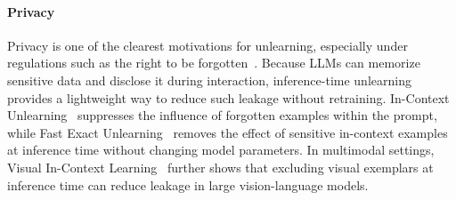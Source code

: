 \paragraph{Privacy}
Privacy is one of the clearest motivations for unlearning, especially under regulations such as the right to be forgotten~\citep{voigt2017eu, bonta2022california}. Because LLMs can memorize sensitive data and disclose it during interaction, inference-time unlearning provides a lightweight way to reduce such leakage without retraining. In-Context Unlearning~\citep{pawelczyk2023context} suppresses the influence of forgotten examples within the prompt, while Fast Exact Unlearning~\citep{muresanufast} removes the effect of sensitive in-context examples at inference time without changing model parameters. In multimodal settings, Visual In-Context Learning~\citep{zhou2024visual} further shows that excluding visual exemplars at inference time can reduce leakage in large vision-language models. 

 
